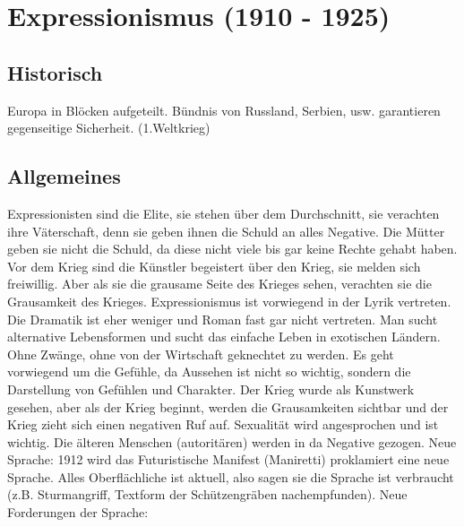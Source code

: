 \documentclass[12pt,a4paper]{article}
\begin{document}
\newpage

\section{Expressionismus (1910 - 1925)}


\subsection{Historisch}

Europa in Blöcken aufgeteilt. Bündnis von Russland, Serbien, usw. garantieren gegenseitige Sicherheit. (1.Weltkrieg)

\subsection{Allgemeines}

Expressionisten sind die Elite, sie stehen über dem Durchschnitt, sie verachten ihre Väterschaft, denn sie geben ihnen die Schuld an alles Negative. Die Mütter geben sie nicht die Schuld, da diese nicht viele bis gar keine Rechte gehabt haben. 
\newline
Vor dem Krieg sind die Künstler begeistert über den Krieg, sie melden sich freiwillig. Aber als sie die grausame Seite des Krieges sehen, verachten sie die Grausamkeit des Krieges. 
\newline
Expressionismus ist vorwiegend in der Lyrik vertreten. Die Dramatik ist eher weniger und Roman fast gar nicht vertreten. Man sucht alternative Lebensformen und sucht das einfache Leben in exotischen Ländern. Ohne Zwänge, ohne von der Wirtschaft geknechtet zu werden. Es geht vorwiegend um die Gefühle, da Aussehen ist nicht so wichtig, sondern die Darstellung von Gefühlen und Charakter.
\newline
\newline
Der Krieg wurde als Kunstwerk gesehen, aber als der Krieg beginnt, werden die Grausamkeiten sichtbar und der Krieg zieht sich einen negativen Ruf auf. Sexualität wird angesprochen und ist wichtig. Die älteren Menschen (autoritären) werden in da 
Negative gezogen.
\newline
\newline
Neue Sprache: 1912 wird das Futuristische Manifest (Maniretti) proklamiert eine neue Sprache. Alles Oberflächliche ist aktuell, also sagen sie die Sprache ist verbraucht (z.B. Sturmangriff, Textform der Schützengräben nachempfunden). 
\newline
\newline
Neue Forderungen der Sprache:
\end{document}
